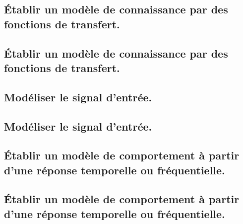 \documentclass[10pt,fleqn]{book}
\newcommand{\repRel}{../..}
\newcommand{\repStyle}{\repRel/Style}
\newcommand{\td}{fichier_td}
\newcommand{\repExos}{\repRel/ExercicesCompetences}
\newcommand{\repExo}{dossier}
\begin{document}
\subsection{Établir un modèle de connaissance par des fonctions de transfert.} 

\subsection{Établir un modèle de connaissance par des fonctions de transfert.} 

\renewcommand{\repExo}{\repExos/B2_ProposerModele/B2_04_ModeleConnaissance/51_MCC}
\renewcommand{\td}{51_MCC}
\graphicspath{{\repStyle/png/}{\repExo/images/}}


\subsection{Modéliser le signal d'entrée.} 

\subsection{Modéliser le signal d'entrée.} 

\subsection{Établir un modèle de comportement à partir d'une réponse temporelle ou fréquentielle. } 

\subsection{Établir un modèle de comportement à partir d'une réponse temporelle ou fréquentielle. } 

\renewcommand{\repExo}{\repExos/B2_ProposerModele/B2_06_ModeleComportement/502_Divers}
\renewcommand{\td}{502_Divers}
\graphicspath{{\repStyle/png/}{\repExo/images/}}


\renewcommand{\repExo}{\repExos/B2_ProposerModele/B2_06_ModeleComportement/503_Divers}
\renewcommand{\td}{503_Divers}
\graphicspath{{\repStyle/png/}{\repExo/images/}}


\renewcommand{\repExo}{\repExos/B2_ProposerModele/B2_06_ModeleComportement/504_Divers}
\renewcommand{\td}{504_Divers}
\graphicspath{{\repStyle/png/}{\repExo/images/}}


\renewcommand{\repExo}{\repExos/B2_ProposerModele/B2_06_ModeleComportement/506_Divers}
\renewcommand{\td}{506_Divers}
\graphicspath{{\repStyle/png/}{\repExo/images/}}

\end{document}

